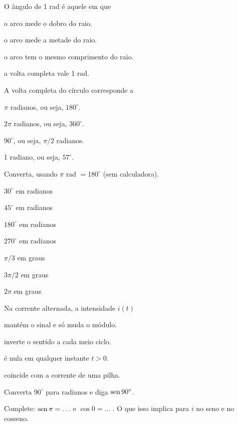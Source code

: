 \documentclass{notaaula}
\begin{document}
\begin{exercicios}
\begin{questoes}
\item O ângulo de 1 rad é aquele em que
  \begin{alternativas}
  \item o arco mede o dobro do raio.
  \item o arco mede a metade do raio.
  \item o arco tem o mesmo comprimento do raio.
  \item a volta completa vale 1 rad.
  \end{alternativas}
\item A volta completa do círculo corresponde a
  \begin{alternativas}
  \item $\pi$ radianos, ou seja, $180^\circ$.
  \item $2\pi$ radianos, ou seja, $360^\circ$.
  \item $90^\circ$, ou seja, $\pi/2$ radianos.
  \item 1 radiano, ou seja, $57^\circ$.
  \end{alternativas}
\item Converta, usando $\pi$ rad $= 180^\circ$ (sem calculadora).
  \begin{alternativas}
  \item $30^\circ$ em radianos
  \item $45^\circ$ em radianos
  \item $180^\circ$ em radianos
  \item $270^\circ$ em radianos
  \item $\pi/3$ em graus
  \item $3\pi/2$ em graus
  \item $2\pi$ em graus
  \end{alternativas}
\item Na corrente alternada, a intensidade $i(t)$
  \begin{alternativas}
  \item mantém o sinal e só muda o módulo.
  \item inverte o sentido a cada meio ciclo.
  \item é nula em qualquer instante $t>0$.
  \item coincide com a corrente de uma pilha.
  \end{alternativas}
\item Converta $90^\circ$ para radianos e diga $\operatorname{sen} 90^\circ$.
\item Complete: $\operatorname{sen}\pi = \ldots$ e $\cos 0 = \ldots$ . O que isso implica
      para $i$ no seno e no cosseno.
\end{questoes}


\end{exercicios}
\end{document}
